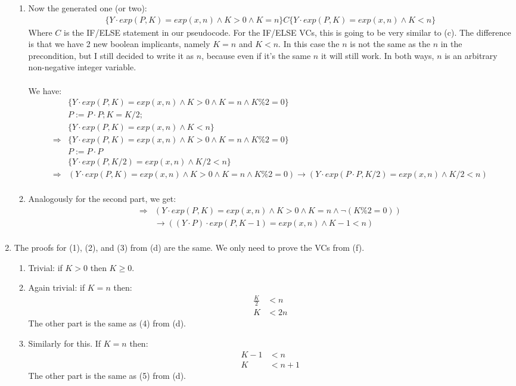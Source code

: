 \documentclass[a4paper]{article}
\begin{document}
\begin{enumerate}[label=(\alph*)]
\begin{enumerate}[label=(\arabic*)]
        \item Now the generated one (or two):
        \begin{align*}
            \{Y\cdot exp(P,K)=exp(x,n)\wedge K>0\wedge K=n\}C\{Y\cdot exp(P,K)=exp(x,n)\wedge K<n\}
        \end{align*}
        Where $C$ is the IF/ELSE statement in our pseudocode. For the IF/ELSE VCs, this is going to be very similar to (c). The difference is that we have 2 new boolean implicants, namely $K=n$ and $K<n$. In this case the $n$ is not the same as the $n$ in the precondition, but I still decided to write it as $n$, because even if it's the same $n$ it will still work. In both ways, $n$ is an arbitrary non-negative integer variable.\\ \\
        We have:
        \begin{align*}
            &\{Y\cdot exp(P,K)=exp(x,n)\wedge K>0\wedge K=n\wedge K\%2=0\}\\&P:=P\cdot P;K=K/2;\\&\{Y\cdot exp(P,K)=exp(x,n)\wedge K<n\}\\
            \Rightarrow&\{Y\cdot exp(P,K)=exp(x,n)\wedge K>0\wedge K=n\wedge K\%2=0\}\\&P:=P\cdot P\\&\{Y\cdot exp(P,K/2)=exp(x,n)\wedge K/2<n\}\\
            \Rightarrow&(Y\cdot exp(P,K)=exp(x,n)\wedge K>0\wedge K=n\wedge K\%2=0)\rightarrow(Y\cdot exp(P\cdot P,K/2)=exp(x,n)\wedge K/2<n)\\
        \end{align*}
        \item Analogously for the second part, we get:
        \begin{align*}
            \Rightarrow&(Y\cdot exp(P,K)=exp(x,n)\wedge K>0\wedge K=n\wedge \neg(K\%2=0))\\&\rightarrow((Y\cdot P)\cdot exp(P,K-1)=exp(x,n)\wedge K-1<n)\\
        \end{align*}
    \end{enumerate}
    \item The proofs for (1), (2), and (3) from (d) are the same. We only need to prove the VCs from (f).
    \begin{enumerate}[label=(\arabic*)]
        \item Trivial: if $K>0$ then $K\ge 0$.
        \item Again trivial: if $K=n$ then:
        \begin{align*}
            \frac{K}{2}&<n\\
            K&<2n
        \end{align*}
        The other part is the same as (4) from (d).
        \item Similarly for this. If $K=n$ then:
        \begin{align*}
            K-1&<n\\
            K&<n+1
        \end{align*}
        The other part is the same as (5) from (d).
    \end{enumerate}
\end{enumerate}
\end{document}
